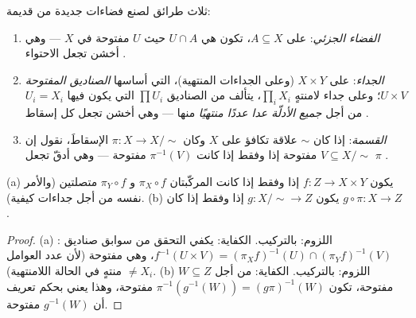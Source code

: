 \begin{definition}\label{def:b3:topology:constructions}
ثلاث طرائق لصنع فضاءات جديدة من قديمة:
\begin{enumerate}
  \item \emph{الفضاء الجزئي}: على $A \subseteq X$، تكون
         هي $U \cap A$ حيث $U$ مفتوحة في $X$
        --- وهي أخشن  تجعل الاحتواء .
  \item \emph{الجداء}: على $X \times Y$ (وعلى الجداءات
        المنتهية)،  التي أساسها \emph{الصناديق
        المفتوحة} $U \times
        V$؛ وعلى جداء لامنتهٍ $\prod_i X_i$،
        يتألف  من الصناديق $\prod U_i$ التي يكون فيها
        $U_i = X_i$ من أجل \emph{جميع الأدلّة عدا عددًا منتهيًا}
        منها --- وهي أخشن  تجعل كل إسقاط .
  \item \emph{القسمة}: إذا كان $\sim$ علاقة تكافؤ على $X$ وكان
        $\pi\colon X \to X/{\sim}$ الإسقاطَ، نقول إن $V
        \subseteq X/{\sim}$ مفتوحة إذا وفقط إذا كانت
        $\pi^{-1}(V)$ مفتوحة --- وهي أدقّ  تجعل $\pi$
        .
\end{enumerate}
\end{definition}

\begin{proposition}
\label{prop:b3:topology:universal}
(a) يكون $f \colon Z \to X \times Y$  إذا وفقط إذا كانت المركّبتان
$\pi_X \circ f$ و $\pi_Y \circ f$ متصلتين (والأمر نفسه من أجل
جداءات كيفية).
(b) يكون $g \colon X/{\sim} \to Z$  إذا وفقط إذا كان $g \circ \pi
\colon X \to Z$ .
\end{proposition}

\begin{proof}
(a) اللزوم: بالتركيب. الكفاية: يكفي التحقق من سوابق صناديق
: $f^{-1}(U \times V) = (\pi_Xf)^{-1}(U)
\cap (\pi_Yf)^{-1}(V)$، وهي مفتوحة (لأن عدد العوامل $\neq X_i$ منتهٍ في
الحالة اللامنتهية). (b) اللزوم: بالتركيب. الكفاية: من أجل
$W \subseteq Z$ مفتوحة، تكون $\pi^{-1}(g^{-1}(W)) = (g\pi)^{-1}(W)$ مفتوحة، وهذا يعني بحكم تعريف
 أن $g^{-1}(W)$ مفتوحة.
\end{proof}

